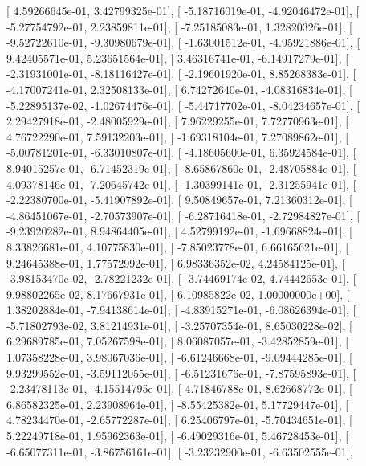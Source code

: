 \documentclass{article}
\begin{document}
       [  4.59266645e-01,   3.42799325e-01],
       [ -5.18716019e-01,  -4.92046472e-01],
       [ -5.27754792e-01,   2.23859811e-01],
       [ -7.25185083e-01,   1.32820326e-01],
       [ -9.52722610e-01,  -9.30980679e-01],
       [ -1.63001512e-01,  -4.95921886e-01],
       [  9.42405571e-01,   5.23651564e-01],
       [  3.46316741e-01,  -6.14917279e-01],
       [ -2.31931001e-01,  -8.18116427e-01],
       [ -2.19601920e-01,   8.85268383e-01],
       [ -4.17007241e-01,   2.32508133e-01],
       [  6.74272640e-01,  -4.08316834e-01],
       [ -5.22895137e-02,  -1.02674476e-01],
       [ -5.44717702e-01,  -8.04234657e-01],
       [  2.29427918e-01,  -2.48005929e-01],
       [  7.96229255e-01,   7.72770963e-01],
       [  4.76722290e-01,   7.59132203e-01],
       [ -1.69318104e-01,   7.27089862e-01],
       [ -5.00781201e-01,  -6.33010807e-01],
       [ -4.18605600e-01,   6.35924584e-01],
       [  8.94015257e-01,  -6.71452319e-01],
       [ -8.65867860e-01,  -2.48705884e-01],
       [  4.09378146e-01,  -7.20645742e-01],
       [ -1.30399141e-01,  -2.31255941e-01],
       [ -2.22380700e-01,  -5.41907892e-01],
       [  9.50849657e-01,   7.21360312e-01],
       [ -4.86451067e-01,  -2.70573907e-01],
       [ -6.28716418e-01,  -2.72984827e-01],
       [ -9.23920282e-01,   8.94864405e-01],
       [  4.52799192e-01,  -1.69668824e-01],
       [  8.33826681e-01,   4.10775830e-01],
       [ -7.85023778e-01,   6.66165621e-01],
       [  9.24645388e-01,   1.77572992e-01],
       [  6.98336352e-02,   4.24584125e-01],
       [ -3.98153470e-02,  -2.78221232e-01],
       [ -3.74469174e-02,   4.74442653e-01],
       [  9.98802265e-02,   8.17667931e-01],
       [  6.10985822e-02,   1.00000000e+00],
       [  1.38202884e-01,  -7.94138614e-01],
       [ -4.83915271e-01,  -6.08626394e-01],
       [ -5.71802793e-02,   3.81214931e-01],
       [ -3.25707354e-01,   8.65030228e-02],
       [  6.29689785e-01,   7.05267598e-01],
       [  8.06087057e-01,  -3.42852859e-01],
       [  1.07358228e-01,   3.98067036e-01],
       [ -6.61246668e-01,  -9.09444285e-01],
       [  9.93299552e-01,  -3.59112055e-01],
       [ -6.51231676e-01,  -7.87595893e-01],
       [ -2.23478113e-01,  -4.15514795e-01],
       [  4.71846788e-01,   8.62668772e-01],
       [  6.86582325e-01,   2.23908964e-01],
       [ -8.55425382e-01,   5.17729447e-01],
       [  4.78234470e-01,  -2.65772287e-01],
       [  6.25406797e-01,  -5.70434651e-01],
       [  5.22249718e-01,   1.95962363e-01],
       [ -6.49029316e-01,   5.46728453e-01],
       [ -6.65077311e-01,  -3.86756161e-01],
       [ -3.23232900e-01,  -6.63502555e-01],
\end{document}
